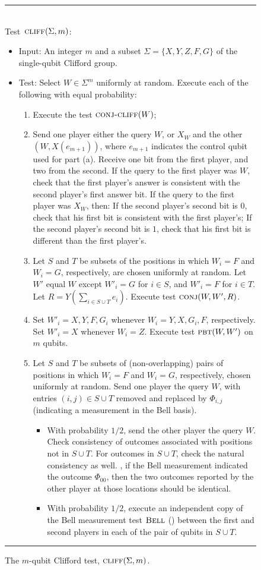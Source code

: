 \documentclass{toc}
\newcommand{\pbt}{\textsc{pbt}}
\newcommand{\conj}{\textsc{conj}}
\newcommand{\bellt}{\textsc{Bell}}
\newcommand{\conjc}{\textsc{conj-cliff}}
\newcommand{\cliff}{\textsc{cliff}}
\begin{document}
\begin{figure}[H]
\rule[1ex]{\textwidth}{0.5pt}\\
Test~$\cliff(\Sigma,m)$:
\begin{itemize}
    \item Input: An integer $m$ and a subset $\Sigma = \{X,Y,Z,F,G\}$ of the single-qubit Clifford group. 
    \item Test: Select $W \in \Sigma^m$ uniformly at random. Execute each of the following with equal probability:
\begin{enumerate}
\item[(a)] Execute the test $\conjc(W)$;
\item[(b)] Send one player either the query $W$, or $X_W$ and the other $(W,X(e_{m+1}))$, where $e_{m+1}$ indicates the control qubit used for part (a). Receive one bit from the first player, and two from the second. If the query to the first player was $W$, check that the first player's answer is consistent with the second player's first answer bit. If the query to the first player was $X_W$, then: If the second player's second bit is $0$, check that his first bit is consistent with the first player's; If the second player's second bit is $1$, check that his first bit is different than the first player's.
\item[(c)] Let $S$ and $T$ be subsets of the positions in which $W_i=F$ and $W_i=G$, %
 respectively,
are %
chosen uniformly at random. Let $W'$ equal $W$ except $W'_i=G$ for $i\in S$, and $W'_i=F$ for $i\in T$. Let  $R = Y(\sum_{i\in S\cup T} e_i)$. Execute test $\conj(W,W', R)$.
\item[(d)] %
%
%
Set $W'_i = X, Y, F, G_i$ whenever $W_i = Y, X, G_i, F$, respectively.
%
%
Set $W'_i = X$ whenever $W_i=Z$. Execute test $\pbt(W,W')$ on $m$ qubits.

\item[(e)] Let $S$ and $T$ be subsets of (non-overlapping) pairs of positions in which $W_i=F$ and $W_i=G$, %
 respectively, chosen uniformly at random. Send one player the query $W$, with entries $(i,j) \in S\cup T$ removed and replaced by $\Phi_{i,j}$ (indicating a measurement in the Bell basis). 
\begin{itemize}
\item With probability $1/2$, send the other player the query $W$. Check consistency of outcomes associated with positions not in $S\cup T$. For outcomes in $S\cup T$, check the natural consistency as 
%
%
well. \Eg,
if the Bell measurement indicated the outcome $\Phi_{00}$, then the two outcomes reported by the other player at those locations should be identical. 
\item With probability $1/2$, execute an independent copy of the Bell measurement test $\bellt$ () between the first and second players in each of the pair of qubits in $S\cup T$. 
\end{itemize}
\end{enumerate}
\end{itemize}
\rule[2ex]{\textwidth}{0.5pt}\vspace{-.5cm}
\caption{The $m$-qubit Clifford test, $\cliff(\Sigma,m)$.}
\label{fig:clifford-test-3}
\end{figure}
\end{document}
